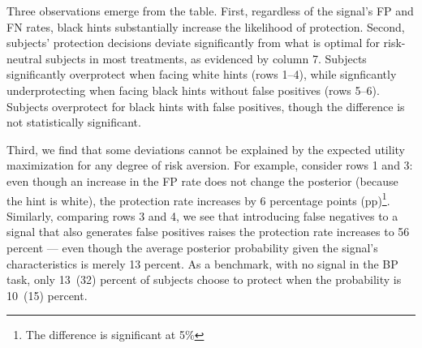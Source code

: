 \documentclass[12pt,a4paper]{article}
\begin{document}
Three observations emerge from the table. First, regardless of the signal's FP and FN rates, black hints substantially increase the likelihood of protection.  Second, subjects' protection decisions deviate significantly from what is optimal for risk-neutral subjects in most treatments, as evidenced by column 7. Subjects significantly overprotect when facing white hints (rows 1--4), while signficantly underprotecting when facing black hints without false positives (rows 5--6).  Subjects overprotect for black hints with false positives, though the difference is not statistically significant. 

Third, we find that some deviations cannot be explained by the expected utility maximization for any degree of risk aversion. For example, consider rows 1 and 3: even though an increase in the FP rate does not change the posterior (because the hint is white), the protection rate increases by 6 percentage points (pp)\footnote{The difference is significant at 5\%}. Similarly, comparing rows 3 and 4, we see that introducing false negatives to a signal that also generates false positives raises the protection rate increases to 56 percent --- even though the average posterior probability given the signal's characteristics is merely 13 percent. As a benchmark, with no signal in the BP task, only 13~(32) percent of subjects choose to protect when the probability is 10~(15) percent. 

\end{document}
